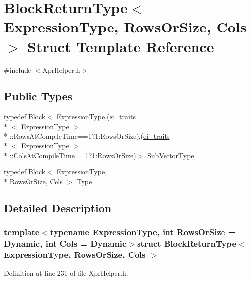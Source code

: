 \hypertarget{struct_block_return_type}{\section{Block\-Return\-Type$<$ Expression\-Type, Rows\-Or\-Size, Cols $>$ Struct Template Reference}
\label{struct_block_return_type}
}


{\ttfamily \#include $<$Xpr\-Helper.\-h$>$}

\subsection*{Public Types}
\begin{DoxyCompactItemize}
\item 
typedef \hyperlink{class_block}{Block}$<$ Expression\-Type,(\hyperlink{structei__traits}{ei\-\_\-traits}\\*
$<$ Expression\-Type $>$\\*
\-::Rows\-At\-Compile\-Time==1?1\-:Rows\-Or\-Size),(\hyperlink{structei__traits}{ei\-\_\-traits}\\*
$<$ Expression\-Type $>$\\*
\-::Cols\-At\-Compile\-Time==1?1\-:Rows\-Or\-Size)$>$ \hyperlink{struct_block_return_type_a8f001915e686ce8786ae838da9210a50}{Sub\-Vector\-Type}
\item 
typedef \hyperlink{class_block}{Block}$<$ Expression\-Type, \\*
Rows\-Or\-Size, Cols $>$ \hyperlink{struct_block_return_type_add2965d23b04edf99213e92dc8753ae0}{Type}
\end{DoxyCompactItemize}


\subsection{Detailed Description}
\subsubsection*{template$<$typename Expression\-Type, int Rows\-Or\-Size = Dynamic, int Cols = Dynamic$>$struct Block\-Return\-Type$<$ Expression\-Type, Rows\-Or\-Size, Cols $>$}



Definition at line 231 of file Xpr\-Helper.\-h.



